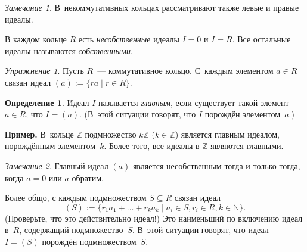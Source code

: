 \documentclass[a4paper,10pt]{amsart}
\def\ZZ{{\mathbb Z}}%
\def\NN{{\mathbb N}}%
\theoremstyle{definition}
\newtheorem{definition}{Определение}
\theoremstyle{remark}
\newtheorem{exercise}{Упражнение}
\newtheorem{remark}{Замечание}
\begin{document}
\begin{remark}
В~некоммутативных кольцах рассматривают также левые и правые идеалы.
\end{remark}

В каждом кольце $R$ есть {\it несобственные} идеалы $I=0$ и $I=R$.
Все остальные идеалы называются {\it собственными}.

\begin{exercise}
Пусть $R$~--- коммутативное кольцо. С~каждым элементом $a \in R$
связан идеал $(a) := \{ ra \mid r \in R \}$.
\end{exercise}

\begin{definition}
Идеал $I$ называется {\it главным}, если существует такой элемент
$a\in R$, что $I=(a)$. (В~этой ситуации говорят, что $I$ порождён
элементом~$a$.)
\end{definition}

\textbf{Пример.} В~кольце $\ZZ$ подмножество $k \ZZ$ ($k \in \ZZ$)
является главным идеалом, порождённым элементом~$k$. Более того, все
идеалы в $\ZZ$ являются главными.

\begin{remark}
Главный идеал $(a)$ является несобственным тогда и только тогда,
когда $a=0$ или $a$ обратим.
\end{remark}

Более общо, с каждым подмножеством $S \subseteq R$ связан идеал
$$
(S) := \{ r_1 a_1 + \ldots + r_k a_k \mid a_i \in S, r_i \in R,
k\in\NN\}.
$$
(Проверьте, что это действительно идеал!) Это наименьший по
включению идеал в~$R$, содержащий подмножество~$S$. В~этой ситуации
говорят, что идеал $I=(S)$ порождён подмножеством~$S$.
\end{document}
